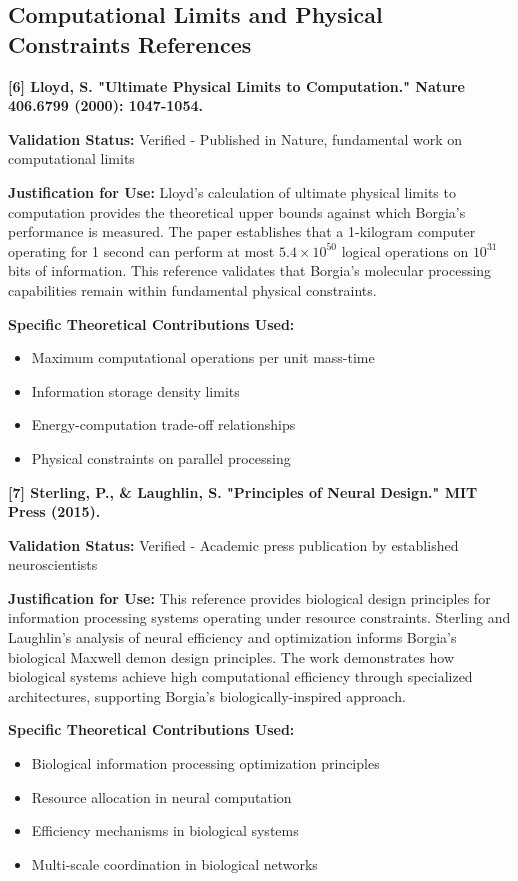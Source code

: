 \subsection{Computational Limits and Physical Constraints References}

\textbf{[6] Lloyd, S. "Ultimate Physical Limits to Computation." Nature 406.6799 (2000): 1047-1054.}

\textbf{Validation Status:} Verified - Published in Nature, fundamental work on computational limits

\textbf{Justification for Use:} Lloyd's calculation of ultimate physical limits to computation provides the theoretical upper bounds against which Borgia's performance is measured. The paper establishes that a 1-kilogram computer operating for 1 second can perform at most $5.4 \times 10^{50}$ logical operations on $10^{31}$ bits of information. This reference validates that Borgia's molecular processing capabilities remain within fundamental physical constraints.

\textbf{Specific Theoretical Contributions Used:}
\begin{itemize}
\item Maximum computational operations per unit mass-time
\item Information storage density limits
\item Energy-computation trade-off relationships
\item Physical constraints on parallel processing
\end{itemize}

\textbf{[7] Sterling, P., \& Laughlin, S. "Principles of Neural Design." MIT Press (2015).}

\textbf{Validation Status:} Verified - Academic press publication by established neuroscientists

\textbf{Justification for Use:} This reference provides biological design principles for information processing systems operating under resource constraints. Sterling and Laughlin's analysis of neural efficiency and optimization informs Borgia's biological Maxwell demon design principles. The work demonstrates how biological systems achieve high computational efficiency through specialized architectures, supporting Borgia's biologically-inspired approach.

\textbf{Specific Theoretical Contributions Used:}
\begin{itemize}
\item Biological information processing optimization principles
\item Resource allocation in neural computation
\item Efficiency mechanisms in biological systems
\item Multi-scale coordination in biological networks
\end{itemize}

